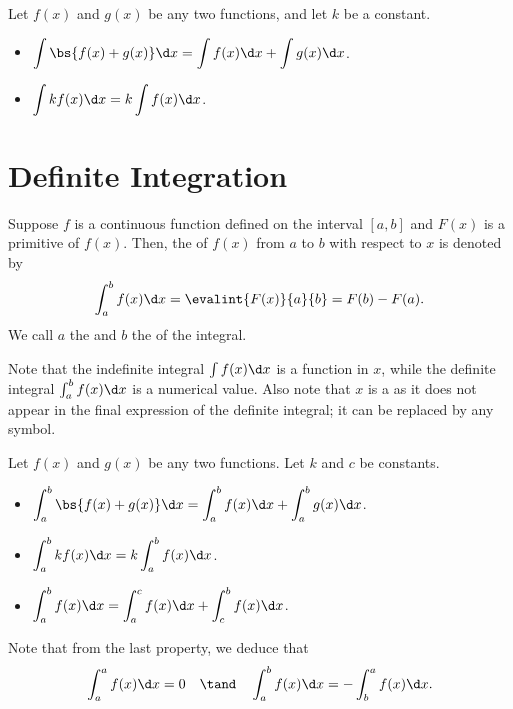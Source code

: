 \begin{fact}
    Let $f(x)$ and $g(x)$ be any two functions, and let $k$ be a constant. 
    \begin{itemize}
        \item $\displaystyle\int \bs{f(x) + g(x)} \d x = \int f(x) \d x + \int g(x) \d x$.
        \item $\displaystyle\int k f(x) \d x = k \int f(x) \d x$.
    \end{itemize}
\end{fact}

\section{Definite Integration}

\begin{definition}
    Suppose $f$ is a continuous function defined on the interval $[a, b]$ and $F(x)$ is a primitive of $f(x)$. Then, the  of $f(x)$ from $a$ to $b$ with respect to $x$ is denoted by \[\int_a^b f(x) \d x = \evalint{F(x)}{a}{b} = F(b) - F(a).\] We call $a$ the  and $b$ the  of the integral.
\end{definition}

Note that the indefinite integral $\int f(x) \d x$ is a function in $x$, while the definite integral $\int_a^b f(x) \d x$ is a numerical value. Also note that $x$ is a  as it does not appear in the final expression of the definite integral; it can be replaced by any symbol.

\begin{fact}
    Let $f(x)$ and $g(x)$ be any two functions. Let $k$ and $c$ be constants.
    \begin{itemize}
        \item $\displaystyle\int_a^b \bs{f(x) + g(x)} \d x = \int_a^b f(x) \d x + \int_a^b g(x) \d x$.
        \item $\displaystyle\int_a^b k f(x) \d x = k \int_a^b f(x) \d x$.
        \item $\displaystyle\int_a^b f(x) \d x = \int_a^c f(x) \d x + \int_c^b f(x) \d x$.
    \end{itemize}
\end{fact}

Note that from the last property, we deduce that \[\int_a^a f(x) \d x = 0 \quad \tand \quad \int_a^b f(x) \d x = -\int_b^a f(x) \d x.\]

